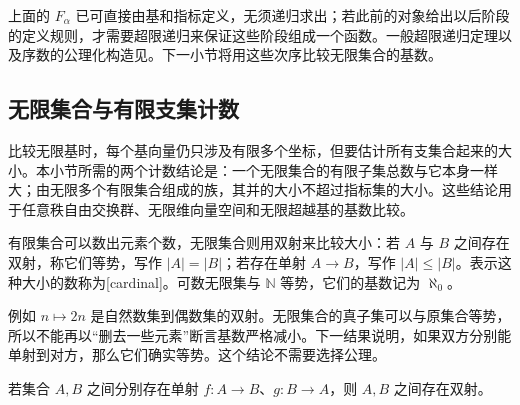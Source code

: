 \ProseParagraphBreak
上面的 \(F_\alpha\) 已可直接由基和指标定义，无须递归求出；若此前的对象给出以后阶段的定义规则，才需要超限递归来保证这些阶段组成一个函数。一般超限递归定理以及序数的公理化构造见\cite[Chapters 5--6]{Johnstone1987LogicSetTheory}。下一小节将用这些次序比较无限集合的基数。

\subsection{无限集合与有限支集计数}
\label{b1:subsec:A01:05}

比较无限基时，每个基向量仍只涉及有限多个坐标，但要估计所有支集合起来的大小。本小节所需的两个计数结论是：一个无限集合的有限子集总数与它本身一样大；由无限多个有限集合组成的族，其并的大小不超过指标集的大小。这些结论用于任意秩自由交换群、无限维向量空间和无限超越基的基数比较。

\ProseParagraphBreak
有限集合可以数出元素个数，无限集合则用双射来比较大小：若 \(A\) 与 \(B\) 之间存在双射，称它们等势，写作 \(\lvert A\rvert=\lvert B\rvert\)；若存在单射 \(A\rightarrow B\)，写作 \(\lvert A\rvert\leq\lvert B\rvert\)。表示这种大小的数称为[cardinal]。可数无限集与 \(\mathbb N\) 等势，它们的基数记为 \(\aleph_0\)。

\ProseParagraphBreak
例如 \(n\mapsto2n\) 是自然数集到偶数集的双射。无限集合的真子集可以与原集合等势，所以不能再以“删去一些元素”断言基数严格减小。下一结果说明，如果双方分别能单射到对方，那么它们确实等势。这个结论不需要选择公理。

\begin{proposition}\label{b1:prop:cantor-bernstein}
	若集合 \(A,B\) 之间分别存在单射 \(f:A\rightarrow B\)、\(g:B\rightarrow A\)，则 \(A,B\) 之间存在双射。
\end{proposition}

